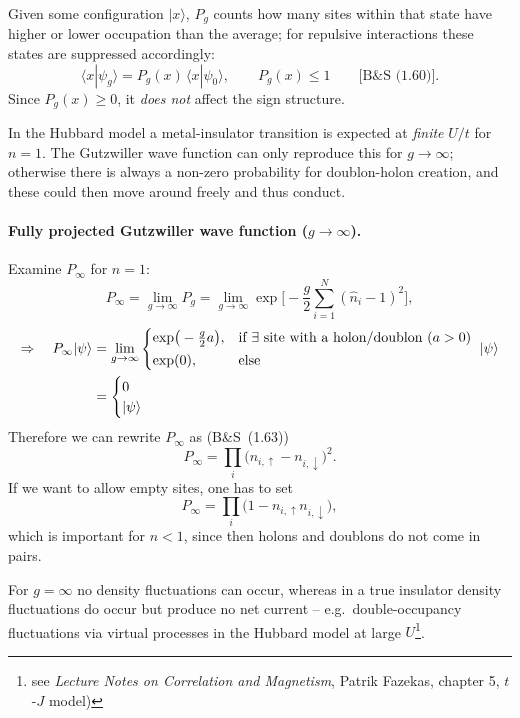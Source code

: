 \documentclass[../../main.tex]{subfiles}
\begin{document}
Given some configuration $|x\rangle$, $P_g$ counts how many sites within that
state have higher or lower occupation than the average; for repulsive
interactions these states are suppressed accordingly:
\begin{equation}
\langle x|\psi_g\rangle=P_g(x)\,\langle x|\psi_0\rangle,
\qquad P_g(x)\le 1
\qquad\text{[B\&S~(1.60)]}.
\end{equation}
Since $P_g(x)\ge 0$, it \emph{does not} affect the sign structure.

In the Hubbard model a metal-insulator transition is expected at \emph{finite}
$U/t$ for $n=1$. The Gutzwiller wave function can only reproduce this for
$g\to\infty$; otherwise there is always a non-zero probability for
doublon-holon creation, and these could then move around freely and thus conduct.

\paragraph{Fully projected Gutzwiller wave function ($g\to\infty$).}
Examine $P_\infty$ for $n=1$:
\begin{equation}
P_\infty=\lim_{g\to\infty}P_g
=\lim_{g\to\infty}\exp\Big[-\frac{g}{2}\sum_{i=1}^{N}(\hat n_i-1)^2\Big],
\end{equation}
\begin{align}
\Rightarrow\quad
P_\infty|\psi\rangle &=\lim_{g\to\infty}
\begin{cases}
\exp\!\big(-\tfrac{g}{2}a\big), & \text{if }\exists\ \text{site with a holon/doublon }(a>0) \notag\\[2pt]
\exp(0), & \text{else}
\end{cases}
\ |\psi\rangle \\
&=\begin{cases}0\\ |\psi\rangle\end{cases}
\end{align}
Therefore we can rewrite $P_\infty$ as (B\&S~(1.63))
\begin{equation}
P_\infty=\prod_i\big(n_{i,\uparrow}-n_{i,\downarrow}\big)^2.
\end{equation}
If we want to allow empty sites, one has to set
\begin{equation}
P_\infty=\prod_i\big(1-n_{i,\uparrow}n_{i,\downarrow}\big),
\end{equation}
which is important for $n<1$, since then holons and doublons do not come in
pairs.

For $g=\infty$ no density fluctuations can occur, whereas in a true insulator
density fluctuations do occur but produce no net current -- e.g.\ double-occupancy
fluctuations via virtual processes in the Hubbard model at large $U$\footnote{see \textit{Lecture Notes on Correlation and Magnetism}, Patrik Fazekas, chapter 5, $t$-$J$ model)}.
\end{document}
